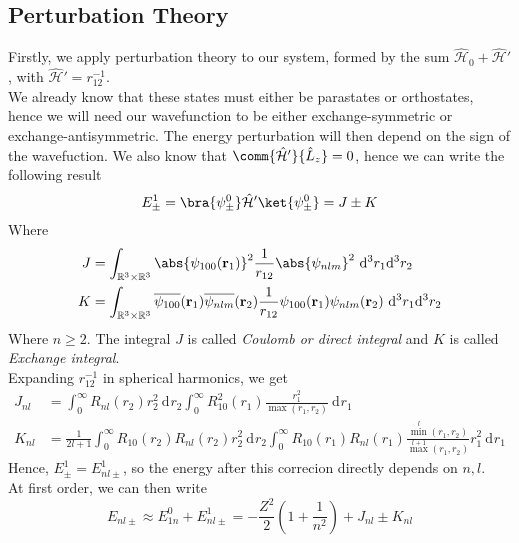 \documentclass[a4paper, 11pt]{book}
\renewcommand{\vec}[1]{\mathbf{#1}}
\newcommand{\1}{\opr{\mathds{1}}}
\newcommand{\diff}[2][]{\ \mathrm{d}^{#1}#2}
\newcommand{\ddiff}[3][]{\ \mathrm{d}^{#1}#2\mathrm{d}^{#1}#3}
\newcommand{\ham}{\mathcal{H}}
\newcommand{\opr}[1]{\hat{#1}}
\newcommand{\cc}[1]{\overline{#1}}
\theoremstyle{plain}
\begin{document}
	\subsection{Perturbation Theory}
	Firstly, we apply perturbation theory to our system, formed by the sum $\opr{\ham}_0+\opr{\ham}'$, with $\opr{\ham}'=r_{12}^{-1}$.\\
	We already know that these states must either be parastates or orthostates, hence we will need our wavefunction to be either exchange-symmetric or exchange-antisymmetric. The energy perturbation will then depend on the sign of the wavefuction. We also know that $\comm{\opr{\ham}'}{\opr{L}_z}=0$, hence we can write the following result
	\begin{equation}
		E_{\pm}^1=\bra{\psi^0_{\pm}}\opr{\ham}'\ket{\psi^0_{\pm}}=J\pm K
		\label{eq:energyplusminusexcited}
	\end{equation}
	Where
	\begin{equation}
		\begin{aligned}
			J&=\int_{\mathbb{R}^3\times\mathbb{R}^3}\abs{\psi_{100}(\vec{r}_1)}^2\frac{1}{r_{12}}\abs{\psi_{nlm}}^2\ddiff[3]{r_1}{r_2}\\
			K&=\int_{\mathbb{R}^3\times\mathbb{R}^3}\cc{\psi_{100}}(\vec{r}_1)\cc{\psi_{nlm}}(\vec{r}_2)\frac{1}{r_{12}}\psi_{100}(\vec{r}_1)\psi_{nlm}(\vec{r}_2)\ddiff[3]{r_1}{r_2}
		\end{aligned}
		\label{eq:jkintegrals}
	\end{equation}
	Where $n\ge2$. The integral $J$ is called \textit{Coulomb or direct integral} and $K$ is called \textit{Exchange integral}.\\
	Expanding $r_{12}^{-1}$ in spherical harmonics, we get
	\begin{equation}
		\begin{aligned}
			J_{nl}&=\int_{0}^{\infty}R_{nl}(r_2)r_2^2\diff{r_2}\int_{0}^{\infty}R_{10}^2(r_1)\frac{r_1^2}{\max(r_1,r_2)}\diff{r_1}\\
			K_{nl}&=\frac{1}{2l+1}\int_{0}^{\infty}R_{10}(r_2)R_{nl}(r_2)r^2_2\diff{r_2}\int_{0}^{\infty}R_{10}(r_1)R_{nl}(r_1)\frac{\min^l(r_1,r_2)}{\max^{l+1}(r_1,r_2)}r_1^2\diff{r_1}
		\end{aligned}
		\label{eq:jkcompleteshexpansion}
	\end{equation}
	Hence, $E_{\pm}^1=E_{nl\pm}^1$, so the energy after this correcion directly depends on $n,l$.\\
	At first order, we can then write
	\begin{equation}
		E_{nl\pm}\approx E_{1n}^0+E_{nl\pm}^1=-\frac{Z^2}{2}\left( 1+\frac{1}{n^2} \right)+J_{nl}\pm K_{nl}
		\label{eq:energyshiftjkintegrals}
	\end{equation}
\end{document}
